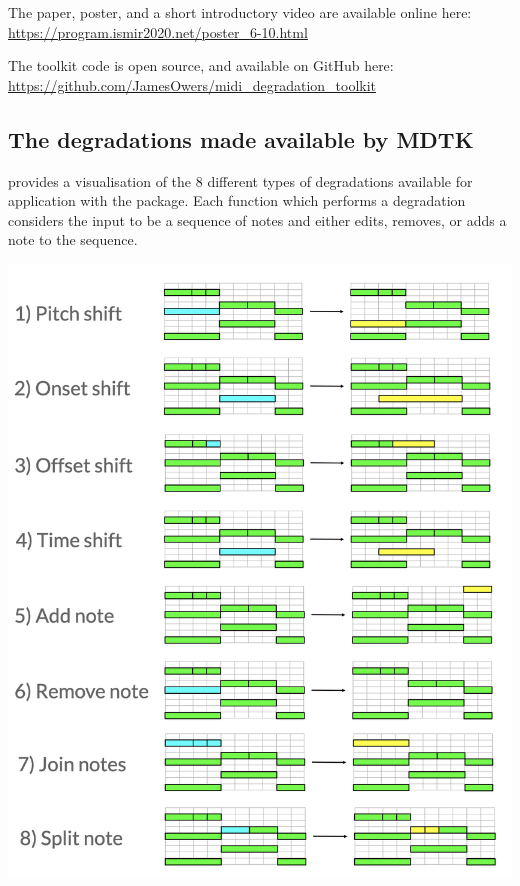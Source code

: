 \documentclass[12pt,a4paper,]{report}
\let\origfigure=\figure
\let\endorigfigure=\endfigure
\renewenvironment{figure}[1][]{%
\origfigure[b]
}{%
\endorigfigure
}
\begin{document}
The paper, poster, and a short introductory video are available online
here: \url{https://program.ismir2020.net/poster_6-10.html}

The toolkit code is open source, and available on GitHub here:
\url{https://github.com/JamesOwers/midi_degradation_toolkit}

\hypertarget{the-degradations-made-available-by-mdtk}{%
\subsection{The degradations made available by
MDTK}\label{the-degradations-made-available-by-mdtk}}

 provides a visualisation of the 8 different
types of degradations available for application with the package. Each
function which performs a degradation considers the input to be a
sequence of notes and either edits, removes, or adds a note to the
sequence.

\begin{figure}[htbp]
\centering
\includegraphics[width=1.0\textwidth]{source/figures/mdtk_degradations.png}
\caption[The degradations available in MDTK]{Illustrations for all the degradations currently available in MDTK}\label{fig:mdtk_degradations}
\end{figure}
\end{document}
